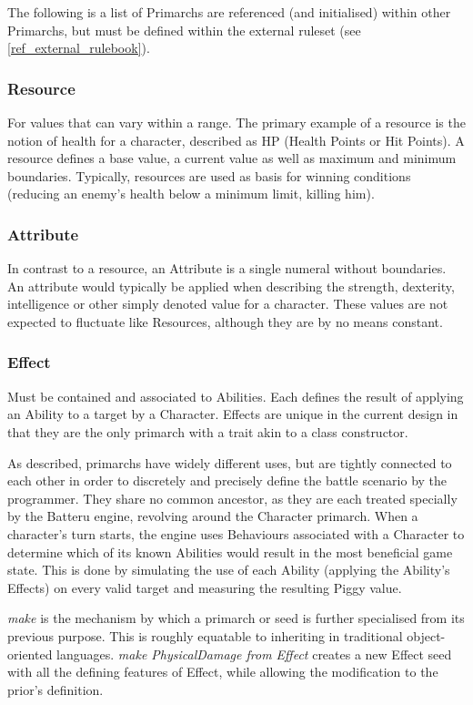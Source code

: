 \noindent The following is a list of Primarchs are referenced (and initialised) within other Primarchs, but must be defined within the external ruleset (see \vref{ref_external_rulebook}).

\subsubsection{Resource}
For values that can vary within a range. The primary example of a resource is the notion of health for a character, described as HP (Health Points or Hit Points). A resource defines a base value, a current value as well as maximum and minimum boundaries. Typically, resources are used as basis for winning conditions (reducing an enemy's health below a minimum limit, killing him).

\subsubsection{Attribute} 
In contrast to a resource, an Attribute is a single numeral without boundaries. An attribute would typically be applied when describing the strength, dexterity, intelligence or other simply denoted value for a character. These values are not expected to fluctuate like Resources, although they are by no means constant.

\subsubsection{Effect}
Must be contained and associated to Abilities. Each defines the result of applying an Ability to a target by a Character. Effects are unique in the current design  in that they are the only primarch with a trait akin to a class constructor.

\noindent As described, primarchs have widely different uses, but are tightly connected to each other in order to discretely and precisely define the battle scenario by the programmer. They share no common ancestor, as they are each treated specially by the Batteru engine, revolving around the Character primarch. When a character's turn starts, the engine uses Behaviours associated with a Character to determine which of its known Abilities would result in the most beneficial game state. This is done by simulating the use of each Ability (applying the Ability's Effects) on every valid target and measuring the resulting Piggy value.

\emph{make} is the mechanism by which a primarch or seed is further specialised from its previous purpose. This is roughly equatable to inheriting in traditional object-oriented languages. \emph{make PhysicalDamage from Effect} creates a new Effect seed with all the defining features of Effect, while allowing the modification to the prior's definition.

